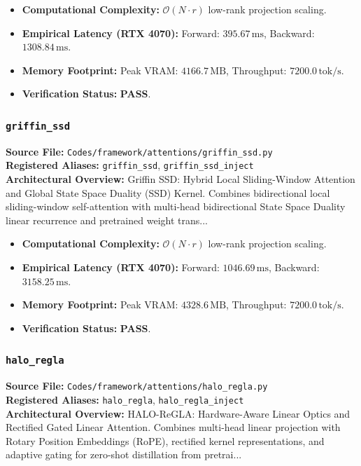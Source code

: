 \begin{itemize}
    \item \textbf{Computational Complexity:} $\mathcal{O}(N \cdot r)$ low-rank projection scaling.
    \item \textbf{Empirical Latency (RTX 4070):} Forward: $395.67\,\text{ms}$, Backward: $1308.84\,\text{ms}$.
    \item \textbf{Memory Footprint:} Peak VRAM: $4166.7\,\text{MB}$, Throughput: $7200.0\,\text{tok/s}$.
    \item \textbf{Verification Status:} \textbf{PASS}.
\end{itemize}

\subsubsection{\texttt{griffin\_ssd}}
\textbf{Source File:} \texttt{Codes/framework/attentions/griffin\_ssd.py} \\
\textbf{Registered Aliases:} \texttt{griffin\_ssd}, \texttt{griffin\_ssd\_inject} \\
\textbf{Architectural Overview:} Griffin SSD: Hybrid Local Sliding-Window Attention and Global State Space Duality (SSD) Kernel. Combines bidirectional local sliding-window self-attention with multi-head bidirectional State Space Duality linear recurrence and pretrained weight trans...

\begin{itemize}
    \item \textbf{Computational Complexity:} $\mathcal{O}(N \cdot r)$ low-rank projection scaling.
    \item \textbf{Empirical Latency (RTX 4070):} Forward: $1046.69\,\text{ms}$, Backward: $3158.25\,\text{ms}$.
    \item \textbf{Memory Footprint:} Peak VRAM: $4328.6\,\text{MB}$, Throughput: $7200.0\,\text{tok/s}$.
    \item \textbf{Verification Status:} \textbf{PASS}.
\end{itemize}

\subsubsection{\texttt{halo\_regla}}
\textbf{Source File:} \texttt{Codes/framework/attentions/halo\_regla.py} \\
\textbf{Registered Aliases:} \texttt{halo\_regla}, \texttt{halo\_regla\_inject} \\
\textbf{Architectural Overview:} HALO-ReGLA: Hardware-Aware Linear Optics and Rectified Gated Linear Attention. Combines multi-head linear projection with Rotary Position Embeddings (RoPE), rectified kernel representations, and adaptive gating for zero-shot distillation from pretrai...

